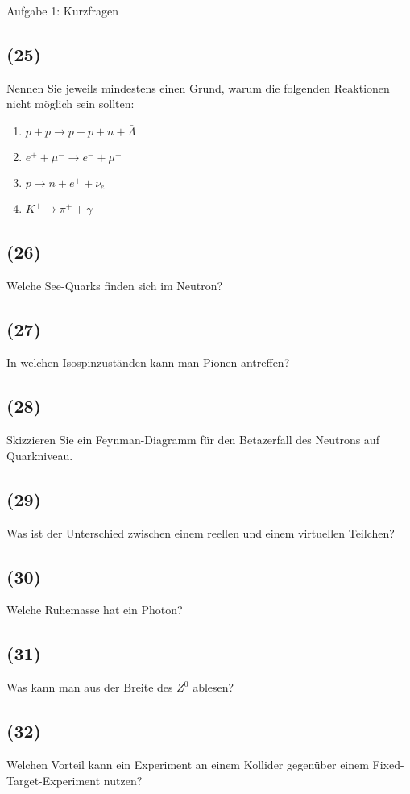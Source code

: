 \begin{aufgabe}{Aufgabe 1: Kurzfragen}
    \subsection{(25)}
    Nennen Sie jeweils mindestens einen Grund, warum die folgenden Reaktionen nicht möglich sein sollten:

    \begin{enumerate}[label=(\roman*)]
        \item $p + p \to p + p + n + \bar\Lambda$
        \item $e^+ + \mu^- \to e^- + \mu^+$
        \item $p \to n + e^+ + \nu_e$
        \item $K^+ \to \pi^+ + \gamma$
    \end{enumerate}

    \subsection{(26)}
    Welche See-Quarks finden sich im Neutron?

    \subsection{(27)}
    In welchen Isospinzuständen kann man Pionen antreffen?

    \subsection{(28)}
    Skizzieren Sie ein Feynman-Diagramm für den Betazerfall des Neutrons auf Quarkniveau.

    \subsection{(29)}
    Was ist der Unterschied zwischen einem reellen und einem virtuellen Teilchen?

    \subsection{(30)}
    Welche Ruhemasse hat ein Photon?

    \subsection{(31)}
    Was kann man aus der Breite des $Z^0$ ablesen?

    \subsection{(32)}
    Welchen Vorteil kann ein Experiment an einem Kollider gegenüber einem Fixed-Target-Experiment nutzen?


\end{aufgabe}
